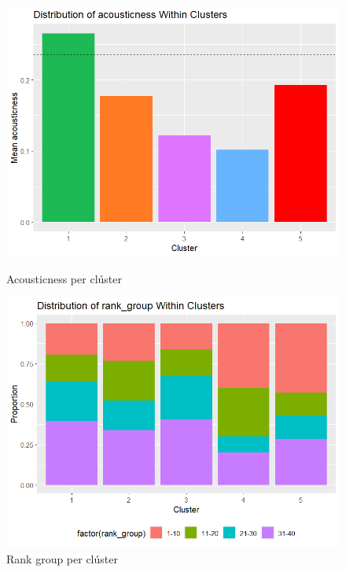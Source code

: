 \begin{figure}[H]
    \centering
    \begin{minipage}{.4\textwidth}
        \centering
        \includegraphics[width=0.95\linewidth]{Images//8_Textual//LSA/profiling_acousticness.png}
        \caption{Acousticness per clúster}
        \label{fig:textual_lsa_profiling_acoust}
    \end{minipage}%
    \begin{minipage}{.4\textwidth}
        \centering
        \includegraphics[width=0.95\linewidth]{Images//8_Textual//LSA/profiling_rank_group.png}
        \caption{Rank group per clúster}
        \label{fig:textual_lsa_profiling_rank}
    \end{minipage}%
\end{figure}

